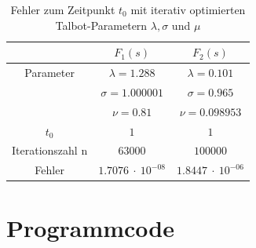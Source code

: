 \begin{table}
\centering
\begin{tabular}[c]{c|c|c}
& $F_{1}(s)$ & $F_{2}(s)$ \\
\hline
Parameter & $\lambda=1.288$ & $\lambda=0.101$ \\
 & $\sigma=1.000001$ & $\sigma=0.965$ \\
 & $\nu=0.81$ & $\nu=0.098953$ \\
\hline
$t_{0}$ & $1$ & $1$ \\
\hline
Iterationszahl n & $63000$ & $100000$ \\
\hline
Fehler & $1.7076~\cdot~10^{-08}$ & $1.8447~\cdot~10^{-06}$ \\
\end{tabular}
\caption{Fehler zum Zeitpunkt $t_{0}$ mit iterativ optimierten Talbot-Parametern $\lambda, \sigma$ und $\mu$
\label{laplace:parametertabelle2}}
\end{table}


%
%
%
%
%
%

\FloatBarrier
\section{Programmcode\label{laplace:section:programmcode}}

